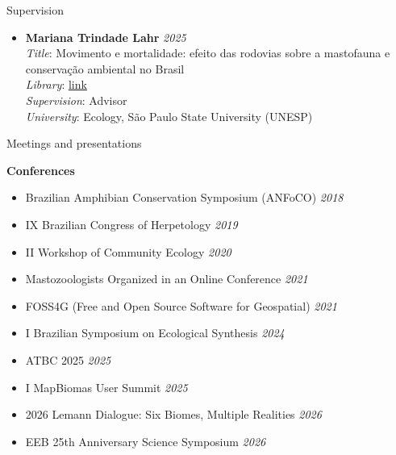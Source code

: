 \documentclass{resume}
\begin{document}
\begin{rSection}{Supervision}
\begin{itemize}
\item \textbf{Mariana Trindade Lahr} \hfill{\em 2025}\\
\textit{Title}: Movimento e mortalidade: efeito das rodovias sobre a mastofauna e conservação ambiental no Brasil\\
\textit{Library}: \href{https://hdl.handle.net/11449/316229}{\underline{link}}\\
\textit{Supervision}: Advisor\\
\textit{University}: Ecology, São Paulo State University (UNESP)
\end{itemize}
\end{rSection}


\begin{rSection}{Meetings and presentations}

\textbf{Conferences}
\begin{itemize}
\item Brazilian Amphibian Conservation Symposium (ANFoCO) \hfill{\em 2018}
\item IX Brazilian Congress of Herpetology \hfill{\em 2019}
\item II Workshop of Community Ecology \hfill{\em 2020}
\item Mastozoologists Organized in an Online Conference \hfill{\em 2021}
\item FOSS4G (Free and Open Source Software for Geospatial) \hfill{\em 2021}
\item I Brazilian Symposium on Ecological Synthesis \hfill{\em 2024}
\item ATBC 2025 \hfill{\em 2025}
\item I MapBiomas User Summit \hfill{\em 2025}
\item 2026 Lemann Dialogue: Six Biomes, Multiple Realities \hfill{\em 2026}
\item EEB 25th Anniversary Science Symposium \hfill{\em 2026}
\end{itemize}

\end{rSection}

\end{document}
